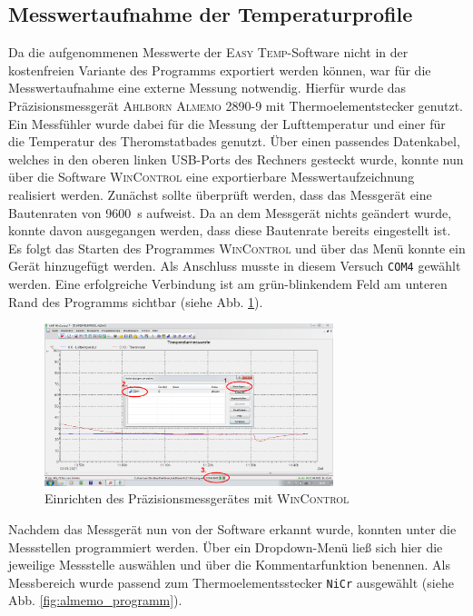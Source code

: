 \subsection{Messwertaufnahme der Temperaturprofile}
Da die aufgenommenen Messwerte der \textsc{Easy Temp}-Software nicht in der kostenfreien Variante des Programms exportiert werden können, war für die Messwertaufnahme eine externe Messung notwendig. Hierfür wurde das Präzisionsmessgerät \textsc{Ahlborn Almemo 2890-9} mit Thermoelementstecker genutzt. Ein Messfühler wurde dabei für die Messung der Lufttemperatur und einer für die Temperatur des Theromstatbades genutzt. Über einen passendes Datenkabel, welches in den oberen linken USB-Ports des Rechners gesteckt wurde, konnte nun über die Software \textsc{WinControl} eine exportierbare Messwertaufzeichnung realisiert werden.
Zunächst sollte überprüft werden, dass das Messgerät eine Bautenraten von \SI{9600}{\second} aufweist. Da an dem Messgerät nichts geändert wurde, konnte davon ausgegangen werden, dass diese Bautenrate bereits eingestellt ist. Es folgt das Starten des Programmes \textsc{WinControl} und über das Menü  konnte ein Gerät hinzugefügt werden. Als Anschluss musste in diesem Versuch \texttt{COM4} gewählt werden. Eine erfolgreiche Verbindung ist am grün-blinkendem Feld am unteren Rand des Programms sichtbar (siehe Abb. \ref{fig:almemo_gerat}).

\begin{figure}[h!]
	\centering
	\includegraphics[width=0.75\textwidth]{img/almemo_1}
	\caption{Einrichten des Präzisionsmessgerätes mit \textsc{WinControl}}
	\label{fig:almemo_gerat}
\end{figure}
\FloatBarrier

Nachdem das Messgerät nun von der Software erkannt wurde, konnten unter  die Messstellen programmiert werden. Über ein Dropdown-Menü ließ sich hier die jeweilige Messstelle auswählen und über die Kommentarfunktion benennen. Als Messbereich wurde passend zum Thermoelementsstecker \texttt{NiCr} ausgewählt (siehe Abb. \ref{fig:almemo_programm}).

